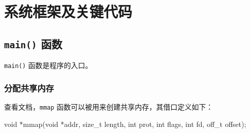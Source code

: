 \section{系统框架及关键代码}

\subsection{\texttt{main()} 函数}

\texttt{main()} 函数是程序的入口。

\subsubsection{分配共享内存}
查看文档，\texttt{mmap} 函数可以被用来创建共享内存，其借口定义如下：\begin{cppcode}
void *mmap(void *addr, size_t length, int prot, int flags, int fd, off_t offset);
\end{cppcode} 
